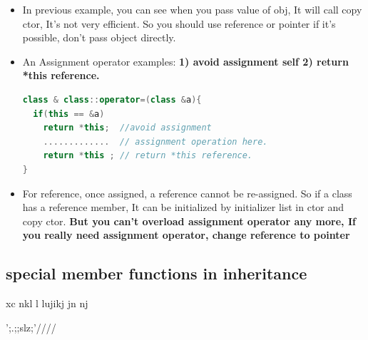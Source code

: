 \documentclass[a4paper,12pt,twoside]{book}
\begin{document}
\begin{itemize}
\item In previous example, you can see when you pass  value of obj, It will call copy ctor, It's not very efficient. So you should use reference or pointer if it's possible, don't pass object directly.


\item An Assignment operator examples: \textbf{1) avoid assignment self 2) return *this reference. }
\begin{lstlisting}[frame=single, language=c++]
class & class::operator=(class &a){
  if(this == &a)
    return *this;  //avoid assignment
    .............  // assignment operation here.
    return *this ; // return *this reference.
}
\end{lstlisting}

\item For reference, once assigned, a reference cannot be re-assigned. So if a class has a reference member, It can be initialized by initializer list in ctor and copy ctor. \textbf{But you can't overload assignment operator any more, If you really need assignment operator, change reference to pointer}

\end{itemize}


\subsection{special member functions in inheritance}
xc                 nkl
l
lujikj
jn
nj




';.;;slz;'////
\end{document}
